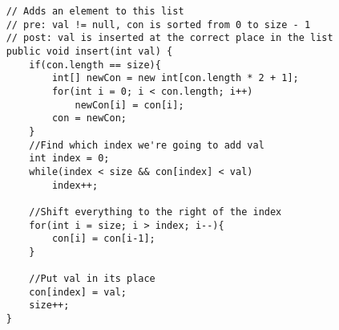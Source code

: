 \documentclass[12pt,letter]{article}
\begin{document}
\clearpage
\begin{verbatim}
    // Adds an element to this list
    // pre: val != null, con is sorted from 0 to size - 1
    // post: val is inserted at the correct place in the list
    public void insert(int val) {
        if(con.length == size){
            int[] newCon = new int[con.length * 2 + 1];
            for(int i = 0; i < con.length; i++)
                newCon[i] = con[i];
            con = newCon;
        }
        //Find which index we're going to add val
        int index = 0;
        while(index < size && con[index] < val)
            index++;

        //Shift everything to the right of the index
        for(int i = size; i > index; i--){
            con[i] = con[i-1];
        }

        //Put val in its place
        con[index] = val;
        size++;
    }
\end{verbatim}
\end{document}
